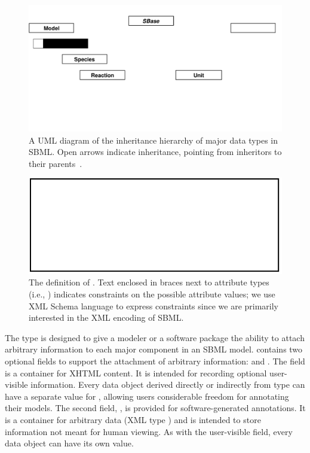 \documentclass[10pt,twocolumntoc]{cekarticle}
\begin{document}
\begin{figure}[h]
  \vspace*{8pt}
  \centering
  \includegraphics[scale = 0.7]{top-level}
  \caption{A UML diagram of the inheritance hierarchy of major data types
    in SBML.  Open arrows indicate inheritance, pointing from inheritors to
    their parents~\citep{eriksson:1998,oestereich:1999}.}
  \label{fig:top-level}
\end{figure}

\begin{figure}[h]
  \centering
  \includegraphics[scale = 0.68]{identified}
  \caption{The definition of .  Text enclosed in braces next
    to attribute types (i.e., ) indicates
    constraints on the possible attribute values; we use XML Schema
    language to express constraints since we are primarily interested in
    the XML encoding of SBML.}
  \label{fig:sbase}
\end{figure}

The type  is designed to give a modeler or a software package
the ability to attach arbitrary information to each major component in an
SBML model.   contains two optional fields to support the
attachment of arbitrary information:  and
.  The field  is a container for XHTML
content.  It is intended for recording optional user-visible information.
Every data object derived directly or indirectly from type 
can have a separate value for , allowing users considerable
freedom for annotating their models.  The second field,
, is provided for software-generated annotations.  It is
a container for arbitrary data (XML type ) and is intended to
store information not meant for human viewing.  As with the user-visible
 field, every data object can have its own
 value.
\end{document}

